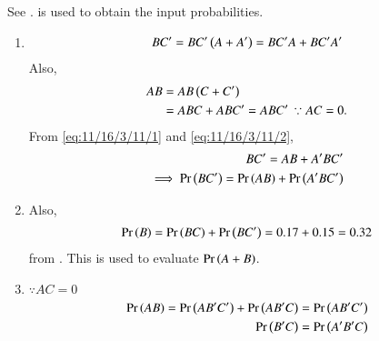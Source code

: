 See 
.
 is used to obtain the input probabilities.
\begin{enumerate}
	\item
\begin{align}
BC^\prime	
=
	BC^\prime\brak{A+A^\prime}=	
	BC^\prime A+BC^\prime A^\prime	
\label{eq:11/16/3/11/1}
\end{align}
Also, 
\begin{align}
	AB&=
	AB\brak{C+C^\prime}
	\\
	&=	
	ABC+ABC^\prime = ABC^\prime  \, \because AC=0.
\label{eq:11/16/3/11/2}
\end{align}
From 
\eqref{eq:11/16/3/11/1}
and
\eqref{eq:11/16/3/11/2},
\begin{align}
BC^\prime = AB+A^\prime BC^\prime
\\
\implies
	\Pr\left(BC^\prime\right) = \Pr\left(AB\right)+\Pr\left(A^\prime BC^\prime\right)
\end{align}
\item Also, 
\begin{align}
\Pr\left(B\right) = \Pr\left(BC\right)+\Pr\left(BC^\prime\right) = 0.17+0.15 = 0.32
\end{align}
from 
.  This is used to evaluate $\Pr\left(A+B\right)$.
\item $\because AC=0$
\begin{align}
	\Pr\left(AB\right)=\Pr\left(AB^\prime C^\prime\right) +\Pr\left(A B^\prime C\right) &= \Pr\left(AB^\prime C^\prime\right)
	\\
	\Pr\left(B^\prime C\right) &= \Pr\left(A^\prime B^\prime C\right)
\end{align}
\end{enumerate}
\begin{table}[htb]
\centering
\scriptsize
	
\caption{}
\label{tab:11/16/3/11}
\end{table}
